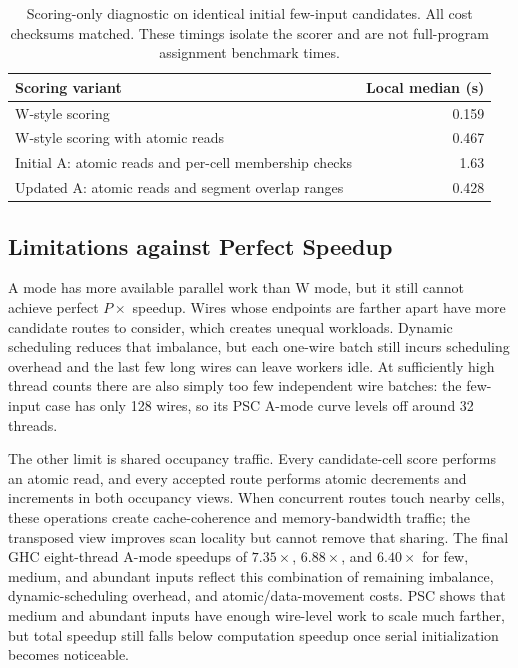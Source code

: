 \documentclass[11pt]{article}
\begin{document}
\begin{table}[!htbp]
\centering
\small
\begin{tabular}{@{}l r@{}}
\toprule
Scoring variant & Local median (s) \\
\midrule
W-style scoring & 0.159 \\
W-style scoring with atomic reads & 0.467 \\
Initial A: atomic reads and per-cell membership checks & 1.63 \\
Updated A: atomic reads and segment overlap ranges & 0.428 \\
\bottomrule
\end{tabular}
\caption{Scoring-only diagnostic on identical initial few-input candidates.
All cost checksums matched. These timings isolate the scorer and are not
full-program assignment benchmark times.}
\label{tab:across-scoring-isolation}
\end{table}
\FloatBarrier

\FloatBarrier

\subsection{Limitations against Perfect Speedup}

A mode has more available parallel work than W mode, but it still cannot achieve
perfect $P\times$ speedup. Wires whose endpoints are farther apart have more
candidate routes to consider, which creates unequal workloads. Dynamic scheduling reduces that
imbalance, but each one-wire batch still incurs scheduling overhead and the last
few long wires can leave workers idle. At sufficiently high thread counts there
are also simply too few independent wire batches: the few-input case has only
128 wires, so its PSC A-mode curve levels off around 32 threads.

The other limit is shared occupancy traffic. Every candidate-cell score performs
an atomic read, and every accepted route performs atomic decrements and
increments in both occupancy views. When concurrent routes touch nearby cells,
these operations create cache-coherence and memory-bandwidth traffic; the
transposed view improves scan locality but cannot remove that sharing. The final
GHC eight-thread A-mode speedups of $7.35\times$, $6.88\times$, and
$6.40\times$ for few, medium, and abundant inputs reflect this combination of
remaining imbalance, dynamic-scheduling overhead, and atomic/data-movement
costs. PSC shows that medium and abundant inputs have enough wire-level work to
scale much farther, but total speedup still falls below computation speedup once
serial initialization becomes noticeable.
\end{document}
